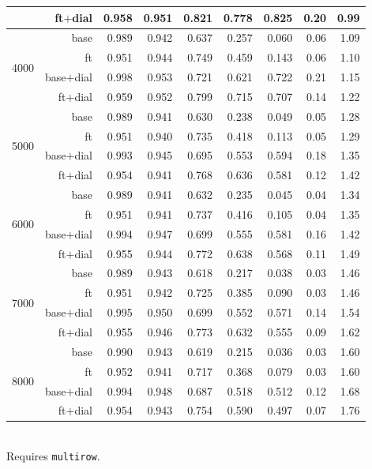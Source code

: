 \begin{table}[t]
\begin{tabular}{lrrrrrrrr}
     & ft$+$dial & 0.958 & 0.951 & 0.821 & 0.778 & 0.825 & 0.20 & 0.99 \\
    \midrule
    \multirow{4}{*}{4000} & base & 0.989 & 0.942 & 0.637 & 0.257 & 0.060 & 0.06 & 1.09 \\
     & ft & 0.951 & 0.944 & 0.749 & 0.459 & 0.143 & 0.06 & 1.10 \\
     & base$+$dial & 0.998 & 0.953 & 0.721 & 0.621 & 0.722 & 0.21 & 1.15 \\
     & ft$+$dial & 0.959 & 0.952 & 0.799 & 0.715 & 0.707 & 0.14 & 1.22 \\
    \midrule
    \multirow{4}{*}{5000} & base & 0.989 & 0.941 & 0.630 & 0.238 & 0.049 & 0.05 & 1.28 \\
     & ft & 0.951 & 0.940 & 0.735 & 0.418 & 0.113 & 0.05 & 1.29 \\
     & base$+$dial & 0.993 & 0.945 & 0.695 & 0.553 & 0.594 & 0.18 & 1.35 \\
     & ft$+$dial & 0.954 & 0.941 & 0.768 & 0.636 & 0.581 & 0.12 & 1.42 \\
    \midrule
    \multirow{4}{*}{6000} & base & 0.989 & 0.941 & 0.632 & 0.235 & 0.045 & 0.04 & 1.34 \\
     & ft & 0.951 & 0.941 & 0.737 & 0.416 & 0.105 & 0.04 & 1.35 \\
     & base$+$dial & 0.994 & 0.947 & 0.699 & 0.555 & 0.581 & 0.16 & 1.42 \\
     & ft$+$dial & 0.955 & 0.944 & 0.772 & 0.638 & 0.568 & 0.11 & 1.49 \\
    \midrule
    \multirow{4}{*}{7000} & base & 0.989 & 0.943 & 0.618 & 0.217 & 0.038 & 0.03 & 1.46 \\
     & ft & 0.951 & 0.942 & 0.725 & 0.385 & 0.090 & 0.03 & 1.46 \\
     & base$+$dial & 0.995 & 0.950 & 0.699 & 0.552 & 0.571 & 0.14 & 1.54 \\
     & ft$+$dial & 0.955 & 0.946 & 0.773 & 0.632 & 0.555 & 0.09 & 1.62 \\
    \midrule
    \multirow{4}{*}{8000} & base & 0.990 & 0.943 & 0.619 & 0.215 & 0.036 & 0.03 & 1.60 \\
     & ft & 0.952 & 0.941 & 0.717 & 0.368 & 0.079 & 0.03 & 1.60 \\
     & base$+$dial & 0.994 & 0.948 & 0.687 & 0.518 & 0.512 & 0.12 & 1.68 \\
     & ft$+$dial & 0.954 & 0.943 & 0.754 & 0.590 & 0.497 & 0.07 & 1.76 \\
    \bottomrule
  \end{tabular}
  \vspace{2pt}\\ \footnotesize Requires \texttt{multirow}.
\end{table}
